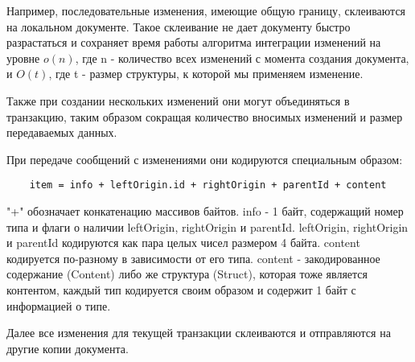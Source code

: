 \documentclass[a4paper,12pt]{article}
\begin{document}
    Например, последовательные изменения, имеющие общую границу, склеиваются на локальном документе. Такое склеивание не дает документу быстро разрастаться и сохраняет время работы алгоритма интеграции изменений на уровне $o(n)$, где n - количество всех изменений с момента создания документа, и $O(t)$, где t - размер структуры, к которой мы применяем изменение.

    Также при создании нескольких изменений они могут объединяться в транзакцию, таким образом сокращая количество вносимых изменений и размер передаваемых данных.

    При передаче сообщений с изменениями они кодируются специальным образом:

    \begin{verbatim}
    item = info + leftOrigin.id + rightOrigin + parentId + content
    \end{verbatim}
    "+" обозначает конкатенацию массивов байтов. info - 1 байт, содержащий номер типа и флаги о наличии leftOrigin, rightOrigin и parentId. leftOrigin, rightOrigin и parentId кодируются как пара целых чисел размером 4 байта. content кодируется по-разному в зависимости от его типа. content - закодированное содержание (Content) либо же структура (Struct), которая тоже является контентом, каждый тип кодируется своим образом и содержит 1 байт с информацией о типе.

    Далее все изменения для текущей транзакции склеиваются и отправляются на другие копии документа.
\end{document}
